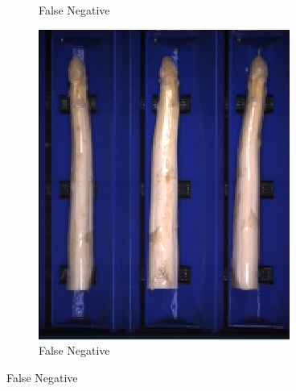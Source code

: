 \begin{figure}[h]
\begin{subfigure}{0.3\textwidth}
		\vspace{-5pt}
		\caption{False Negative}
	\end{subfigure}
	\begin{subfigure}{0.3\textwidth}
		\includegraphics[width=0.9\linewidth]{Figures/appendix/rustybody_falsenegative_03.png}
		\vspace{-5pt}
		\caption{False Negative}
	\end{subfigure}


\end{figure}
